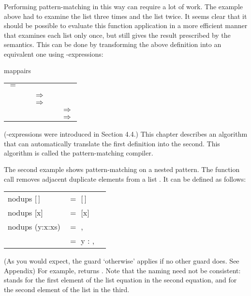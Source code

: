 Performing pattern-matching in this way can require a lot of work. The example above had to examine the list \ml{[1,2]} three times and the list \ml{[3,4]} twice. It seems clear that it should be possible to evaluate this function application in a more efficient manner that examines each list only once, but still gives the result prescribed by the semantics. This can be done by transforming the above definition into an equivalent one using -expressions:

\begin{mlcoded}
    \setlength{\tabcolsep}{2pt}
    mappairs\\
    \begin{tabular}{lllll}
    $=$ \tlb{f} &\tlb{xs$'$} \tlb{ys$'$} & & & \\
    & \ml{case xs$'$ of} & & & \\
    & \ml{NIL} &$\Rightarrow$ &\ml{NIL} & \\
    & \ml{CONS x xs} &$\Rightarrow$ &\ml{case ys$'$ of} & \\
    & & &\ml{NIL} &$\Rightarrow$ \ml{NIL} \\
    & & &\ml{CONS y ys} &$\Rightarrow$ \ml{CONS (f x y)\! (mappairs\! f\! xs\! ys)}
    \end{tabular}
\end{mlcoded}
(-expressions were introduced in Section 4.4.) This chapter describes an algorithm that can automatically translate the first definition into the second. This algorithm is called the pattern-matching compiler.

The second example shows pattern-matching on a nested pattern. The function call  removes adjacent duplicate elements from a list . It can be defined as follows:

\begin{mlcoded}
\begin{tabular}{lll}
    nodups [\,] &$=$ [\,] &\\
    nodups [x] &$=$ [x] & \\
    nodups (y:x:xs) &$=$ \ml{nodups (x:xs)}, &\ml{y $=$ x} \\
     &$=$ y : \ml{nodups (x:xs)}, &\normalfont{otherwise}
\end{tabular}
\end{mlcoded}

(As you would expect, the guard `otherwise' applies if no other guard does. See Appendix) For example,  returns \ml{[3,1,2,3]}. Note that the naming need not be consistent:  stands for the first element of the list equation in the second equation, and for the second element of the list in the third.

